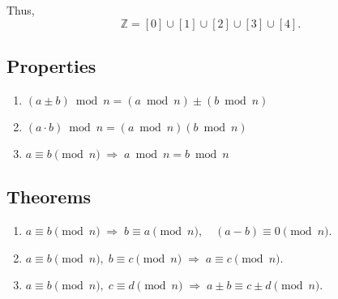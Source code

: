\documentclass[hidelinks]{article}
\theoremstyle{mystyle}
\begin{document}
Thus,
\[
\mathbb{Z} = [0] \cup [1] \cup [2] \cup [3] \cup [4].
\]

\subsection*{Properties}
\begin{enumerate}[label=(\arabic*)]
    \item $(a \pm b) \bmod n = (a \bmod n) \pm (b \bmod n)$
    \item $(a \cdot b) \bmod n = (a \bmod n)(b \bmod n)$
    \item $a \equiv b \pmod{n} \;\Rightarrow\; a \bmod n = b \bmod n$
\end{enumerate}

\subsection*{Theorems}
\begin{enumerate}[label=(\roman*)]
    \item $a \equiv b \pmod{n} \;\Rightarrow\; b \equiv a \pmod{n}, \quad (a-b) \equiv 0 \pmod{n}$.
    \item $a \equiv b \pmod{n},\; b \equiv c \pmod{n} \;\Rightarrow\; a \equiv c \pmod{n}$.
    \item $a \equiv b \pmod{n},\; c \equiv d \pmod{n} \;\Rightarrow\; a \pm b \equiv c \pm d \pmod{n}$.
\end{enumerate}
\end{document}
